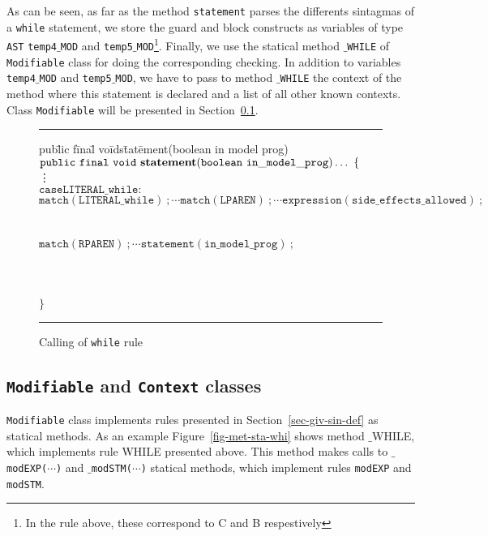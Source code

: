\documentclass[a4paper]{llncs}
\begin{document}
As can be seen, as far as the method \texttt{statement} parses the differents sintagmas of a \texttt{while} statement, we store the guard and block constructs as variables of type \texttt{AST} \texttt{temp4$\_$MOD} and \texttt{temp5$\_$MOD}\footnote{In the rule above, these correspond to \textsc{C} and \textsc{B} respestively}. Finally, we use the statical method \texttt{$\_$WHILE} of \texttt{Modifiable} class for doing the corresponding checking. In addition to variables \texttt{temp4$\_$MOD} and \texttt{temp5$\_$MOD}, we have to pass to method \texttt{$\_$WHILE} the context of the method where this statement is declared and a list of all other known contexts. Class \texttt{Modifiable} will be presented in Section~\ref{mod-and-con-clab}.
\begin{figure}[hbt]
\rule{\linewidth}{0.25mm}
\begin{tabbing}
pub\=lic f\=ina\=l vo\=ids\=tat\=ement(boolean in model prog) \kill 
\> $\mathtt{public\ final\ void\ {\bf statement}(boolean\ in\_model\_prog)\hdots \ \{}$ \\
\>\>\vdots \\
\>\>$\mathtt{case LITERAL\_while:}$ \\
\>\>\>$\mathtt{match(LITERAL\_while)\ ;\cdots match(LPAREN)\ ; \cdots expression(side\_effects\_allowed)\ ;}$ \\
\>\> \\
\>\> \\
\>\>\>$\mathtt{match(RPAREN)\ ; \cdots statement(in\_model\_prog)\ ;}$ \\
\>\> \\
\>\> \\
\>\> \\
\>$\mathtt{\}}$ 
\end{tabbing}
\caption{Calling of {\tt while} rule}
\label{fig-cal-whi-rul}
\rule{\linewidth}{0.25mm}
\end{figure}




\subsection{\texttt{Modifiable} and \texttt{Context} classes}
\label{mod-and-con-clab}
\texttt{Modifiable} class implements rules presented in Section~\ref{sec-giv-sin-def} as statical methods. As an example Figure~\ref{fig-met-sta-whi} shows method \textup{$\_$WHILE}, which implements rule \textup{WHILE} presented above. This method makes calls to \texttt{$\_$modEXP($\cdots$)} and \texttt{$\_$modSTM($\cdots$)} statical methods, which implement rules \texttt{modEXP} and \texttt{modSTM}.
\end{document}
